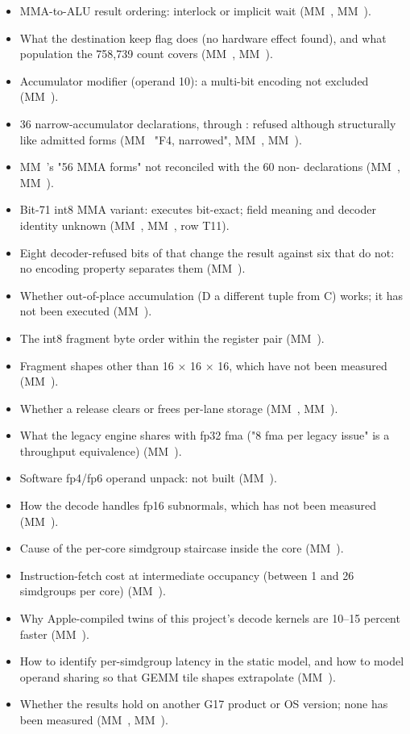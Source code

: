 \begin{itemize}
\item MMA-to-ALU result ordering: interlock or implicit wait (MM~, MM~).
\item What the destination keep flag does (no hardware effect found), and what population the 758,739 count covers (MM~, MM~).
\item Accumulator modifier (operand 10): a multi-bit encoding not excluded (MM~).
\item 36 narrow-accumulator declarations,  through : refused although structurally like admitted forms (MM~ "F4, narrowed", MM~, MM~).
\item MM~'s "56 MMA forms" not reconciled with the 60 non- declarations (MM~, MM~).
\item Bit-71 int8 MMA variant: executes bit-exact; field meaning and decoder identity unknown (MM~, MM~, row T11).
\item Eight decoder-refused bits of  that change the result against six that do not: no encoding property separates them (MM~).
\item Whether out-of-place accumulation (D a different tuple from C) works; it has not been executed (MM~).
\item The int8 fragment byte order within the register pair (MM~).
\item Fragment shapes other than 16 × 16 × 16, which have not been measured (MM~).
\item Whether a release clears or frees per-lane storage (MM~, MM~).
\item What the legacy engine shares with fp32 fma ("8 fma per legacy issue" is a throughput equivalence) (MM~).
\item Software fp4/fp6 operand unpack: not built (MM~).
\item How the decode handles fp16 subnormals, which has not been measured (MM~).
\item Cause of the per-core simdgroup staircase inside the core (MM~).
\item Instruction-fetch cost at intermediate occupancy (between 1 and 26 simdgroups per core) (MM~).
\item Why Apple-compiled twins of this project's decode kernels are 10–15 percent faster (MM~).
\item How to identify per-simdgroup latency in the static model, and how to model operand sharing so that GEMM tile shapes extrapolate (MM~).
\item Whether the results hold on another G17 product or OS version; none has been measured (MM~, MM~).
\end{itemize}
